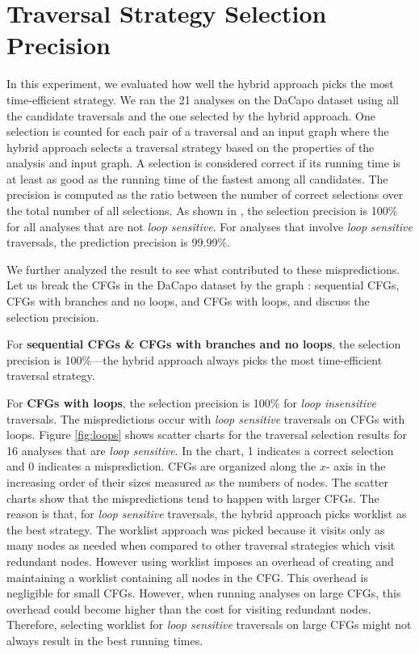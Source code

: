 \section{Traversal Strategy Selection Precision}
\label{sec:prediction-accuracy}





In this experiment, we evaluated how well the hybrid approach picks the most 
time-efficient strategy. We ran the 21 analyses on the DaCapo dataset using 
all the candidate traversals and the one selected by the hybrid approach. One 
selection is counted for each pair of a traversal and an input graph where 
the hybrid approach selects a traversal strategy based on the properties of 
the analysis and input graph. A selection is considered correct if its 
running time is at least as good as the running time of the fastest among all 
candidates. The precision is computed as the ratio between the number of 
correct selections over the total number of all selections. 
%
As shown in , the selection precision is 100\% 
for all analyses that are not \textit{loop sensitive}. For analyses that 
involve \textit{loop sensitive} traversals, the prediction precision is 99.99\%. 

We further analyzed the result to see what contributed to these mispredictions. 
Let us break the CFGs in the DaCapo dataset by the graph \graphprop{}: sequential CFGs, 
CFGs with branches and no loops, and CFGs with loops, and discuss the selection precision.

For \textbf{sequential CFGs \& CFGs with branches and no loops}, the selection  
precision is 100\%---the hybrid approach always picks the most time-efficient 
traversal strategy.

For \textbf{CFGs with loops}, the selection precision is 100\% for \emph{loop 
	insensitive} traversals. The mispredictions occur with \emph{loop sensitive} 
traversals on CFGs with loops. Figure \ref{fig:loops} shows scatter charts 
for the traversal selection results for 16 analyses that are \textit{loop 
	sensitive}. In the chart, 1 indicates a correct selection and 0 indicates a 
misprediction. CFGs are organized along the $x$- axis in the increasing order 
of their sizes measured as the numbers of nodes. 
%
The scatter charts show that the mispredictions tend to happen with larger 
CFGs. 
%
The reason is that, for \textit{loop sensitive} traversals, the hybrid 
approach picks worklist as the best strategy. The worklist approach was 
picked because it visits only as many nodes as needed when compared to other 
traversal strategies which visit redundant nodes. However using worklist 
imposes an overhead of creating and maintaining a worklist containing all 
nodes in the CFG. This overhead is negligible for small CFGs. However, when 
running analyses on large CFGs, this overhead could become higher 
than the cost for visiting redundant nodes. Therefore, selecting worklist for 
\emph{loop sensitive} traversals on large CFGs might not always result in the 
best running times. 

